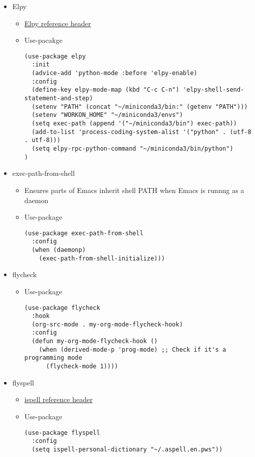 \documentclass{article}
\begin{document}
\begin{itemize}
\item Elpy
\label{sec:org932bbd8}
\begin{itemize}
\item \href{basecamp.org}{Elpy reference header}
\label{sec:orgc14e449}
\item Use-pacakge
\label{sec:orge4e1cf0}
\begin{verbatim}
(use-package elpy
  :init
  (advice-add 'python-mode :before 'elpy-enable)
  :config
  (define-key elpy-mode-map (kbd "C-c C-n") 'elpy-shell-send-statement-and-step)
  (setenv "PATH" (concat "~/miniconda3/bin:" (getenv "PATH")))
  (setenv "WORKON_HOME" "~/miniconda3/envs")
  (setq exec-path (append '("~/miniconda3/bin") exec-path))
  (add-to-list 'process-coding-system-alist '("python" . (utf-8 . utf-8)))
  (setq elpy-rpc-python-command "~/miniconda3/bin/python")
)
\end{verbatim}
\end{itemize}
\item exec-path-from-shell
\label{sec:org0aacbc4}
\begin{itemize}
\item Ensures parts of Emacs inherit shell PATH when Emacs is runnng as a daemon
\end{itemize}
\begin{itemize}
\item Use-package
\label{sec:orgf8f9494}
\begin{verbatim}
(use-package exec-path-from-shell
  :config
  (when (daemonp)
    (exec-path-from-shell-initialize)))

\end{verbatim}
\end{itemize}
\item flycheck
\label{sec:orgaa6d4b9}
\begin{itemize}
\item Use-package
\label{sec:orge7e5a56}
\begin{verbatim}
(use-package flycheck
  :hook
  (org-src-mode . my-org-mode-flycheck-hook)
  :config
  (defun my-org-mode-flycheck-hook ()
    (when (derived-mode-p 'prog-mode) ;; Check if it's a programming mode
      (flycheck-mode 1))))

\end{verbatim}
\end{itemize}
\item flyspell
\label{sec:orgf61a6d4}
\begin{itemize}
\item \href{basecamp.org}{ispell reference header}
\label{sec:org15bdae0}
\item Use-package
\label{sec:orgabd871d}
\begin{verbatim}
(use-package flyspell
  :config
  (setq ispell-personal-dictionary "~/.aspell.en.pws"))


\end{verbatim}
\end{itemize}
\end{itemize}
\end{document}
